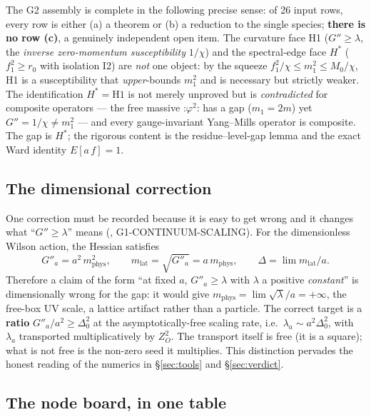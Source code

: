 The G2 assembly is complete in the following precise sense: of 26 input rows, every row is
either (a) a theorem or (b) a reduction to the single species; \textbf{there is no row (c)}, a
genuinely independent open item. The curvature face H1 ($G''\ge\lambda$, the \emph{inverse
zero-momentum susceptibility} $1/\chi$) and the spectral-edge face $H^*$ ($f_1^2\ge r_0$ with
isolation I2) are \emph{not} one object: by the squeeze $f_1^2/\chi\le m_1^2\le M_0/\chi$, H1 is a
susceptibility that \emph{upper}-bounds $m_1^2$ and is necessary but strictly weaker. The
identification $H^*=\text{H1}$ is not merely unproved but is \emph{contradicted} for composite
operators --- the free massive $\mathord{:}\varphi^2\mathord{:}$ has a gap ($m_1=2m$) yet
$G''=1/\chi\ne m_1^2$ --- and every gauge-invariant Yang--Mills operator is composite. The gap is
$H^*$; the rigorous content is the residue--level-gap lemma and the exact Ward identity $E[a\,f]=1$.

\figplane

\subsection{The dimensional correction}

One correction must be recorded because it is easy to get wrong and it changes what
``$G''\ge\lambda$'' means (, G1-CONTINUUM-SCALING). For the
dimensionless Wilson action, the Hessian satisfies
\begin{equation}
G''_a=a^2\,m_{\mathrm{phys}}^2,\qquad
m_{\mathrm{lat}}=\sqrt{G''_a}=a\,m_{\mathrm{phys}},\qquad
\Delta=\lim m_{\mathrm{lat}}/a .
\label{eq:dim}
\end{equation}
Therefore a claim of the form ``at fixed $a$, $G''_a\ge\lambda$ with $\lambda$ a positive
\emph{constant}'' is dimensionally wrong for the gap: it would give
$m_{\mathrm{phys}}=\lim\sqrt{\lambda}/a=+\infty$, the free-box UV scale, a lattice artifact
rather than a particle. The correct target is a \textbf{ratio} $G''_a/a^2\ge\Delta_0^2$ at the
asymptotically-free scaling rate, i.e.\ $\lambda_a\sim a^2\Delta_0^2$, with $\lambda_a$
transported multiplicatively by $Z_O^2$. The transport itself is free (it is a square); what is
not free is the non-zero seed it multiplies. This distinction pervades the honest reading of the
numerics in \S\ref{sec:tools} and \S\ref{sec:verdict}.

\subsection{The node board, in one table}


